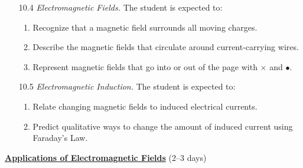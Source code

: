 \documentclass[dvipsnames]{article}
\begin{document}
\begin{enumerate}[topsep=0pt]
    \item[10.4] \textit{Electromagnetic Fields.} The student is expected to:
    \begin{enumerate}[topsep=0pt,itemsep=0pt]
        \item Recognize that a magnetic field surrounds all moving charges.
        \item Describe the magnetic fields that circulate around current-carrying wires.
        \item Represent magnetic fields that go into or out of the page with $\times$ and $\bullet$.
    \end{enumerate}
    \item[10.5] \textit{Electromagnetic Induction.} The student is expected to:
    \begin{enumerate}[topsep=0pt,itemsep=0pt]
        \item Relate changing magnetic fields to induced electrical currents.
        \item Predict qualitative ways to change the amount of induced current using Faraday's Law.
    \end{enumerate}
\end{enumerate}

\textbf{\underline{Applications of Electromagnetic Fields}} (2--3 days)
\end{document}
